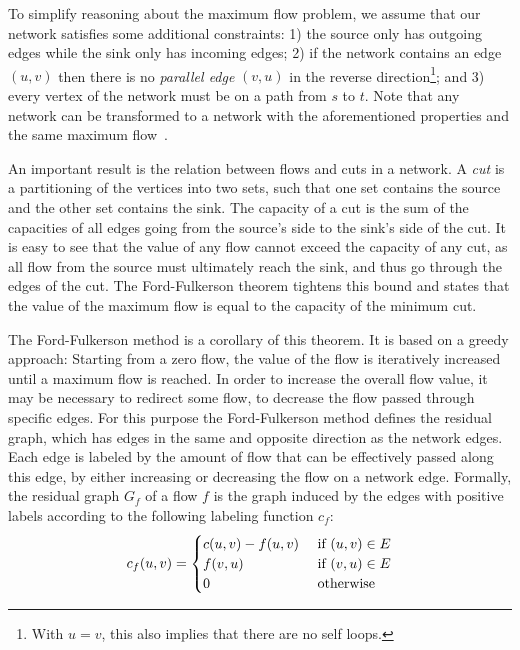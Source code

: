 \documentclass[smallcondensed]{svjour3}     %
\begin{document}
To simplify reasoning about the maximum flow problem, we assume that our network satisfies some additional constraints: 1) the source only has outgoing edges while the sink only has incoming edges; 2) if the network contains an edge $(u, v)$ then there is no \emph{parallel edge} $(v, u)$ in the reverse direction\footnote{With $u=v$, this also implies that there are no self loops.}; and 3) every vertex of the network must be on a path from $s$ to $t$. Note that any network can be transformed to a network with the aforementioned properties and the same maximum flow~\cite{CLRS09}.


An important result is the relation between flows and cuts in a network. A \emph{cut} is a partitioning of the vertices into two sets, such that one set contains 
the source and the other set contains the sink. The capacity of a cut is the sum of the capacities of all edges going from the source's side to the sink's side of the cut.
It is easy to see that the value of any flow cannot exceed the capacity of any cut, as all flow from the source must ultimately reach the sink, and thus go through the edges of the cut. The Ford-Fulkerson theorem tightens this bound and states that the value of the maximum flow is equal to the capacity of the minimum cut.

The Ford-Fulkerson method is a corollary of this theorem. It is based on a greedy approach: Starting from a zero flow, the value of the flow is iteratively increased until a maximum flow is reached. In order to increase the overall flow value, it may be necessary to redirect some flow, \ie to decrease the flow passed through specific edges. For this purpose the Ford-Fulkerson method defines the residual graph, which has edges in the same and opposite direction as the network edges.
Each edge is labeled by the amount of flow that can be effectively passed along this edge, by either increasing or decreasing the flow on a network edge.
Formally, the residual graph $G_f$ of a flow $f$ is the graph induced by the 
edges with positive labels according to the following labeling function $c_f$:
\[ c_f (u, v) = 
  \begin{cases}
  c (u, v) - f(u, v) \hfill & \text{ if $(u, v) \in E$} \\
  f (v, u) \hfill & \text{ if $(v, u) \in E$} \\  
  0 \hfill & \text{ otherwise} \\
  \end{cases} 
\]
\end{document}
